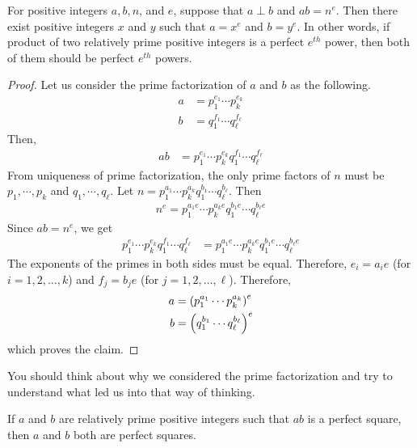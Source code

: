 \begin{theorem}
	For positive integers $a, b, n$, and $e$, suppose that $a\perp b$ and $ab=n^e$. Then there exist positive integers $x$ and $y$ such that $a=x^e$ and $b=y^e$. In other  words, if product of two relatively prime positive integers is a perfect $e^{th}$ power, then both of them should be perfect $e^{th}$ powers. \label{thm:copower}
\end{theorem}

\begin{proof}
	Let us consider the prime factorization of $a$ and $b$ as the following.
	\begin{align*}
		a
			& = p_1^{e_1}\cdots p_k^{e_k}\\
		b
			& = q_1^{f_1}\cdots q_\ell^{f_\ell}
	\end{align*}
	Then,
	\begin{align*}
		ab &= p_1^{e_1}\cdots p_k^{e_k}q_1^{f_1}\cdots q_\ell^{f_\ell}
	\end{align*}
	From uniqueness of prime factorization, the only prime factors of $n$ must be $p_1,\cdots,p_k$ and $q_1,\cdots,q_\ell$. Let $n = p_1^{a_1}\cdots p_k^{a_k}q_1^{b_1}\cdots q_\ell^{b_\ell}$. Then
	\begin{align*}
		n^e  = p_1^{a_1e}\cdots p_k^{a_ke}q_1^{b_1e}\cdots q_\ell^{b_\ell e}
	\end{align*}
	Since $ab=n^e$, we get
	\begin{align*}
		p_1^{e_1}\cdots p_k^{e_k}q_1^{f_1}\cdots q_\ell^{f_\ell} & = p_1^{a_1e}\cdots p_k^{a_ke}q_1^{b_1e}\cdots q_\ell^{b_\ell e}
	\end{align*}
	The exponents of the primes in both sides must be equal. Therefore, $e_i=a_ie$ (for $i=1,2,\ldots,k$) and $f_j=b_je$ (for $j=1,2,\ldots,\ell$). Therefore,
	\begin{align*}
		a
			& = \left(p_1^{a_1}\cdots p_k^{a_k}\right)^e\\
		b
			& = \left(q_1^{b_1}\cdots q_\ell^{b_\ell}\right)^e
	\end{align*}
	which proves the claim.
\end{proof}

\begin{note}
	You should think about why we considered the prime factorization and try to understand what led us into that way of thinking.
\end{note}

\begin{corollary}
	If $a$ and $b$ are relatively prime positive integers such that $ab$ is a perfect square, then $a$ and $b$ both are perfect squares.\label{cor:sqr}
\end{corollary}

